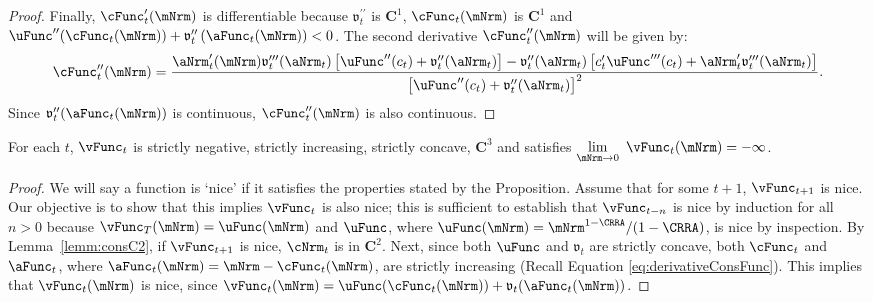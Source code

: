 \documentclass[\econtexRoot/BufferStockTheory]{subfiles}
\begin{document}
\begin{proof}
Finally, $\cFunc_{t}^{\prime }(\mNrm)$ is differentiable because
$\mathfrak{v}_{t}^{\prime \prime }$ is $\mathbf{C}^{1}$, $ \cFunc_{t}(\mNrm)$
is $\mathbf{C}^{1}$ and $\uFunc^{\prime \prime
}(\cFunc_{t}(\mNrm))+\mathfrak{v}_{t}^{\prime \prime }\left( {\aFunc}_{t}(\mNrm)\right)
<0$.
The second derivative $\cFunc_{t}^{\prime \prime }(\mNrm)$ will be given by:
%
%
%
\begin{equation}
  \cFunc_{t}^{\prime \prime }(\mNrm)=\frac{{\aNrm}_{t}^{\prime }(\mNrm)\mathfrak{v}_{t}^{\prime \prime
      \prime }({\aNrm}_{t})\left[ \uFunc^{\prime \prime }(c_{t})+\mathfrak{v}_{t}^{\prime \prime }({\aNrm}_{t})
    \right] -\mathfrak{v}_{t}^{\prime \prime }({\aNrm}_{t})\left[ c_{t}^{\prime }\uFunc^{\prime \prime
        \prime }(c_{t})+{\aNrm}_{t}^{\prime }\mathfrak{v}_{t}^{\prime \prime \prime }({\aNrm}_{t})\right] }{
    {\left[ \uFunc^{\prime \prime }(c_{t})+\mathfrak{v}_{t}^{\prime \prime }({\aNrm}_{t})\right]}^{2}}.
\end{equation}
Since $\mathfrak{v}_{t}^{\prime \prime }({\aFunc}_{t}(\mNrm))$ is continuous,
$\cFunc_{t}^{\prime \prime }(\mNrm)$ is also continuous.
%
%

\end{proof}


\begin{proposition}
For each $t$, $\vFunc_{t}$ is strictly negative, strictly increasing, strictly concave, $\mathbf{C}^{3}$ and satisfies $\lim\limits_{\mNrm\rightarrow 0}~\vFunc_{t}(\mNrm) =-\infty $.
\end{proposition}

\begin{proof}

We will say a function is `nice' if it satisfies the properties stated by the Proposition.
Assume that for some $t+1$, $\vFunc_{t+1}$ is nice.
Our objective is to show that this
implies $\vFunc_{t}$ is also nice; this is sufficient to establish that
$\vFunc_{t-n}$ is nice by induction for all $n > 0$ because $\vFunc_{T}(\mNrm)
=\uFunc(\mNrm) $ and $\uFunc$, where $\uFunc(\mNrm)=\mNrm^{1-\CRRA}/(1-\CRRA)$, is nice by inspection.
By Lemma~\ref{lemm:consC2}, if $\vFunc_{t+1}$ is nice, $\cNrm_{t}$ is in $\mathbf{C}^{2}$.
Next, since both $\uFunc$ and $\mathfrak{v}_{t}$ are strictly concave, both
$\cFunc_{t}$ and $\aFunc_{t}$, where $\aFunc_{t}(\mNrm)=\mNrm-\cFunc_{t}(\mNrm)$,
are strictly increasing (Recall Equation \eqref{eq:derivativeConsFunc}).
This implies that
$\vFunc_{t}(\mNrm)$ is nice, since
$\vFunc_{t}(\mNrm)=\uFunc(\cFunc_{t}(\mNrm))+\mathfrak{v}_{t}({\aFunc}_{t}(\mNrm))$.
\end{proof}
\end{document}
